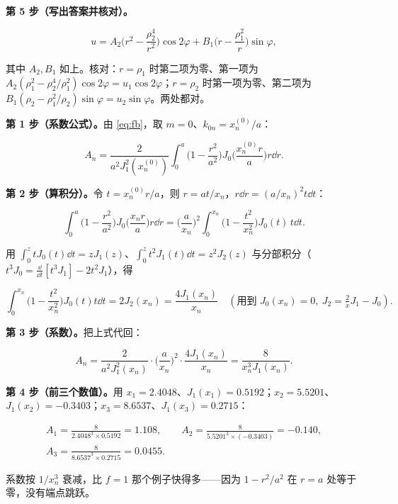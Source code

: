 \textbf{第 5 步（写出答案并核对）。}

\[
u=A_2\Big(r^2-\frac{\rho_2^4}{r^2}\Big)\cos2\varphi
+B_1\Big(r-\frac{\rho_1^2}{r}\Big)\sin\varphi ,
\]

其中 $A_2,B_1$ 如上。核对：$r=\rho_1$ 时第二项为零、第一项为 $A_2(\rho_1^2-\rho_2^4/\rho_1^2)\cos2\varphi=u_1\cos2\varphi$；$r=\rho_2$ 时第一项为零、第二项为 $B_1(\rho_2-\rho_1^2/\rho_2)\sin\varphi=u_2\sin\varphi$。两处都对。



\textbf{第 1 步（系数公式）。}由 \eqref{eq:fb}，取 $m=0$、$k_{0n}=x_n^{(0)}/a$：

\[
A_n=\frac{2}{a^2J_1^2(x_n^{(0)})}\int_0^a\Big(1-\frac{r^2}{a^2}\Big)J_0\Big(\frac{x_n^{(0)}r}{a}\Big)r\dd r .
\]

\textbf{第 2 步（算积分）。}令 $t=x_n^{(0)}r/a$，则 $r=a t/x_n$，$r\dd r=(a/x_n)^2t\dd t$：

\[
\int_0^a\Big(1-\frac{r^2}{a^2}\Big)J_0\Big(\frac{x_nr}{a}\Big)r\dd r
=\Big(\frac{a}{x_n}\Big)^2\int_0^{x_n}\Big(1-\frac{t^2}{x_n^2}\Big)J_0(t)\,t\dd t .
\]

用 $\int_0^ztJ_0(t)\dd t=zJ_1(z)$、$\int_0^zt^2J_1(t)\dd t=z^2J_2(z)$ 与分部积分（$t^3J_0=\frac{\dd}{\dd t}[t^3J_1]-2t^2J_1$），得

\[
\int_0^{x_n}\Big(1-\frac{t^2}{x_n^2}\Big)J_0(t)t\dd t
=2J_2(x_n)
=\frac{4J_1(x_n)}{x_n}\quad(\text{用到 }J_0(x_n)=0,\ J_2=\tfrac{2}{x}J_1-J_0).
\]

\textbf{第 3 步（系数）。}把上式代回：

\[
A_n=\frac{2}{a^2J_1^2(x_n)}\cdot\Big(\frac{a}{x_n}\Big)^2\cdot\frac{4J_1(x_n)}{x_n}
=\frac{8}{x_n^3J_1(x_n)} .
\]

\textbf{第 4 步（前三个数值）。}用 $x_1=2.4048$、$J_1(x_1)=0.5192$；$x_2=5.5201$、$J_1(x_2)=-0.3403$；$x_3=8.6537$、$J_1(x_3)=0.2715$：

\begin{gather*}
A_1=\frac{8}{2.4048^3\times0.5192}=1.108,\qquad
A_2=\frac{8}{5.5201^3\times(-0.3403)}=-0.140,\\
A_3=\frac{8}{8.6537^3\times0.2715}=0.0455 .
\end{gather*}

系数按 $1/x_n^3$ 衰减，比 $f=1$ 那个例子快得多——因为 $1-r^2/a^2$ 在 $r=a$ 处等于零，没有端点跳跃。

